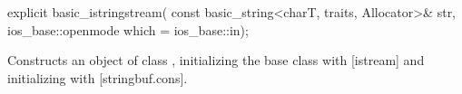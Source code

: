 \documentclass[ebook,11pt,article]{memoir}
\renewcommand{\iref}[1]{[#1]}
\begin{document}
%
\begin{itemdecl}
explicit basic_istringstream(
  const basic_string<charT, traits, Allocator>& str,
  ios_base::openmode which = ios_base::in);
\end{itemdecl}

\begin{itemdescr}
\pnum
\effects
Constructs an object of class
,
initializing the base class with
\iref{istream}
and initializing  with%
\iref{stringbuf.cons}.
\end{itemdescr}
\end{document}
